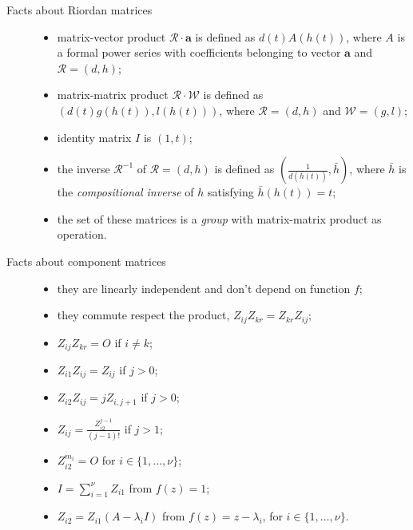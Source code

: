 
\begin{description}

\item[Facts about Riordan matrices]

\begin{itemize} 
\item matrix-vector product $\mathcal{R}\cdot \boldsymbol{a}$ is defined as 
    $ d(t)A(h(t))$, where $A$ is a formal power series
    with coefficients belonging to vector $\boldsymbol{a}$ and $\mathcal{R}=(d, h)$;
\item matrix-matrix product $\mathcal{R}\cdot \mathcal{W}$ is defined as 
    $(d(t)g(h(t)), l(h(t)))$, where $\mathcal{R}=(d, h)$ and $\mathcal{W}=(g, l)$;
\item identity matrix $I$ is $(1, t)$;
\item the inverse $\mathcal{R}^{-1}$ of $\mathcal{R}=(d, h)$ is defined as 
    $\left(\frac{1}{d(\bar{h}(t))}, \bar{h}\right)$, where $\bar{h}$ is the \emph{compositional inverse} 
    of $h$ satisfying $\bar{h}(h(t))=t$;
\item the set of these matrices is a \emph{group} with matrix-matrix product as operation.    
\end{itemize}

\item[Facts about component matrices]

\begin{itemize}
\item they are linearly independent and don't depend on function $f$;
\item they commute respect the product, $Z_{ij}Z_{kr}= Z_{kr}Z_{ij}$;
\item $Z_{ij}Z_{kr}=O$ if $i\neq k$;
\item $Z_{i1}Z_{ij}=Z_{ij}$ if $j > 0 $;
\item $Z_{i2}Z_{ij}=jZ_{i,j+1}$ if $j > 0 $;
\item $Z_{ij}=\frac{Z_{i2}^{j-1}}{(j-1)!}$ if $j > 1 $;
\item $Z_{i2}^{m_{i}}=O$ for $i\in\lbrace 1,\ldots,\nu\rbrace$;
\item $I = \sum_{i=1}^{\nu}{Z_{i1}}$ from $f(z)=1$;
\item $Z_{i2} = Z_{i1}(A-\lambda_{i}I)$ from $f(z)=z-\lambda_{i}$, for
        $i\in\lbrace 1,\ldots,\nu\rbrace$.
\end{itemize}

\end{description}
